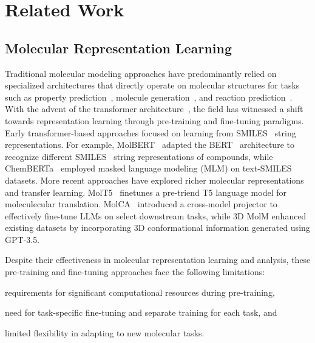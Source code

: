 \section{Related Work}
\subsection{Molecular Representation Learning}
Traditional molecular modeling approaches have predominantly relied on specialized architectures that directly operate on molecular structures for tasks such as property prediction~\cite{guo2021few,stark20223d}, molecule generation~\cite{gong2024text,kim2024data}, and reaction prediction~\cite{liu2024reactxt}. With the advent of the transformer architecture~\cite{vaswani2017attention}, the field has witnessed a shift towards representation learning through pre-training and fine-tuning paradigms. Early transformer-based approaches focused on learning from SMILES~\cite{weininger1988smiles} string representations. For example, MolBERT~\cite{li2021mol} adapted the BERT~\cite{Devlin2019BERTPO} architecture to recognize different SMILES~ string representations of compounds, while ChemBERTa~\cite{chithrananda2020chemberta} employed masked language modeling (MLM) on text-SMILES datasets. More recent approaches have explored richer molecular representations and transfer learning. MolT5~\cite{edwards_translation_2022} finetunes a pre-triend T5 language model for moleculecular translation. %
MolCA~\cite{liu_molca_2023} introduced a cross-model projector to effectively fine-tune LLMs on select downstream tasks, %
while 3D MolM enhanced existing datasets by incorporating 3D conformational information generated using GPT-3.5.

Despite their effectiveness in molecular representation learning and analysis, these pre-training and fine-tuning approaches face the following limitations:
\begin{inparaenum}[(a)]
    \item requirements for significant computational resources during pre-training,
    \item need for task-specific fine-tuning and separate training for each task, and
    \item limited flexibility in adapting to new molecular tasks.
\end{inparaenum}
